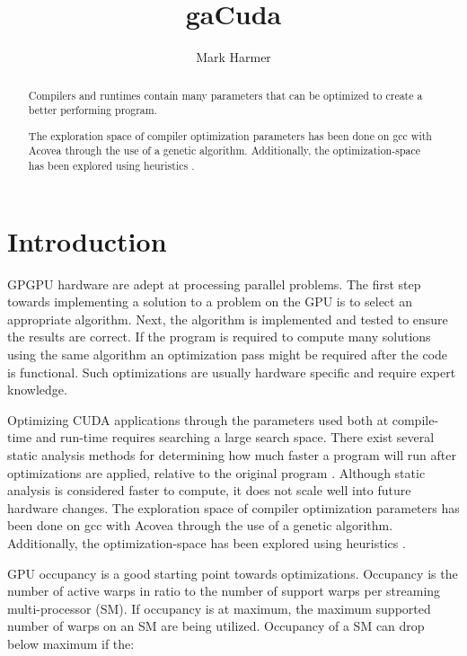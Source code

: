 



\title{gaCuda}

\author{Mark Harmer}

\maketitle

\begin{abstract}
Compilers and runtimes contain many parameters that can be optimized to create a better performing program.

The exploration space of compiler optimization parameters has been done on gcc with Acovea \cite{Acovea} through the use of a genetic algorithm. Additionally, the optimization-space has been explored using heuristics \cite{Triantafyllis}.
\end{abstract}

\section{Introduction}
GPGPU hardware are adept at processing parallel problems. The first step towards implementing a solution to a problem on the GPU is to select an appropriate algorithm. Next, the algorithm is implemented and tested to ensure the results are correct. If the program is required to compute many solutions using the same algorithm an optimization pass might be required after the code is functional. Such optimizations are usually hardware specific and require expert knowledge.

Optimizing CUDA applications through the parameters used both at compile-time and run-time requires searching a large search space. There exist several static analysis methods for determining how much faster a program will run after optimizations are applied, relative to the original program \cite{Murthy2010}. Although static analysis is considered faster to compute, it does not scale well into future hardware changes. The exploration space of compiler optimization parameters has been done on gcc with Acovea \cite{Acovea} through the use of a genetic algorithm. Additionally, the optimization-space has been explored using heuristics \cite{Triangtafyllis}.

GPU occupancy is a good starting point towards optimizations. Occupancy is the number of active warps in ratio to the number of support warps per streaming multi-processor (SM). If occupancy is at maximum, the maximum supported number of warps on an SM are being utilized. Occupancy of a SM can drop below maximum if the:

